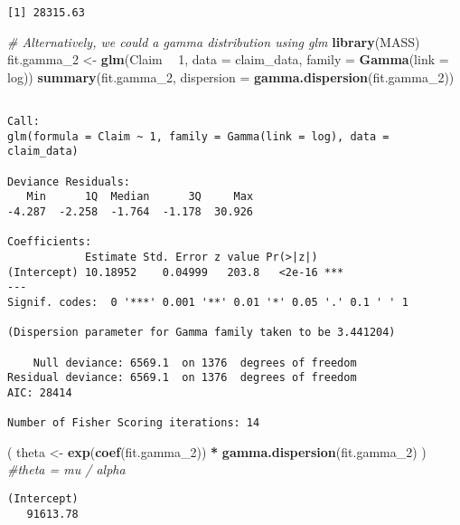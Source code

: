 \documentclass[]{book}
\newenvironment{Shaded}{\begin{snugshade}}{\end{snugshade}}
\newcommand{\KeywordTok}[1]{\textcolor[rgb]{0.13,0.29,0.53}{\textbf{#1}}}
\newcommand{\DataTypeTok}[1]{\textcolor[rgb]{0.13,0.29,0.53}{#1}}
\newcommand{\DecValTok}[1]{\textcolor[rgb]{0.00,0.00,0.81}{#1}}
\newcommand{\StringTok}[1]{\textcolor[rgb]{0.31,0.60,0.02}{#1}}
\newcommand{\CommentTok}[1]{\textcolor[rgb]{0.56,0.35,0.01}{\textit{#1}}}
\newcommand{\OperatorTok}[1]{\textcolor[rgb]{0.81,0.36,0.00}{\textbf{#1}}}
\newcommand{\NormalTok}[1]{#1}
\theoremstyle{definition}
\theoremstyle{definition}
\theoremstyle{definition}
\theoremstyle{remark}
\begin{document}
\begin{verbatim}
[1] 28315.63
\end{verbatim}

\begin{Shaded}
\begin{Highlighting}[]
\CommentTok{# Alternatively, we could a gamma distribution using glm}
\KeywordTok{library}\NormalTok{(MASS)}
\NormalTok{fit.gamma_}\DecValTok{2}\NormalTok{ <-}\StringTok{ }\KeywordTok{glm}\NormalTok{(Claim }\OperatorTok{~}\StringTok{ }\DecValTok{1}\NormalTok{, }\DataTypeTok{data =}\NormalTok{ claim_data, }\DataTypeTok{family =} \KeywordTok{Gamma}\NormalTok{(}\DataTypeTok{link =}\NormalTok{ log)) }
\KeywordTok{summary}\NormalTok{(fit.gamma_}\DecValTok{2}\NormalTok{, }\DataTypeTok{dispersion =} \KeywordTok{gamma.dispersion}\NormalTok{(fit.gamma_}\DecValTok{2}\NormalTok{)) }
\end{Highlighting}
\end{Shaded}

\begin{verbatim}

Call:
glm(formula = Claim ~ 1, family = Gamma(link = log), data = claim_data)

Deviance Residuals: 
   Min      1Q  Median      3Q     Max  
-4.287  -2.258  -1.764  -1.178  30.926  

Coefficients:
            Estimate Std. Error z value Pr(>|z|)    
(Intercept) 10.18952    0.04999   203.8   <2e-16 ***
---
Signif. codes:  0 '***' 0.001 '**' 0.01 '*' 0.05 '.' 0.1 ' ' 1

(Dispersion parameter for Gamma family taken to be 3.441204)

    Null deviance: 6569.1  on 1376  degrees of freedom
Residual deviance: 6569.1  on 1376  degrees of freedom
AIC: 28414

Number of Fisher Scoring iterations: 14
\end{verbatim}

\begin{Shaded}
\begin{Highlighting}[]
\NormalTok{( theta <-}\StringTok{ }\KeywordTok{exp}\NormalTok{(}\KeywordTok{coef}\NormalTok{(fit.gamma_}\DecValTok{2}\NormalTok{)) }\OperatorTok{*}\StringTok{ }\KeywordTok{gamma.dispersion}\NormalTok{(fit.gamma_}\DecValTok{2}\NormalTok{) )  }\CommentTok{#theta = mu / alpha}
\end{Highlighting}
\end{Shaded}

\begin{verbatim}
(Intercept) 
   91613.78 
\end{verbatim}
\end{document}

